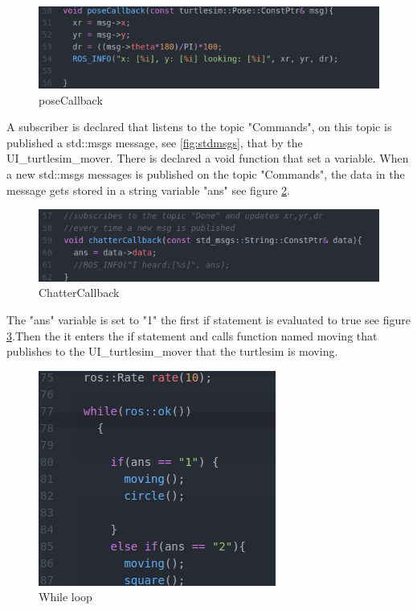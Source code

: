 \begin{figure}[h]
\begin{center}
\includegraphics[width=.5\textwidth]{figures/posecall.png}
\caption{poseCallback}\label{fig:pose}
\end{center} 
\end{figure}

A subscriber is declared  that listens to the topic "Commands", on this topic is published a std::msgs message, see \ref{fig:stdmsgs}, that by the UI\_turtlesim\_mover. There is declared a void function that set a variable. When a new std::msgs messages is published on the topic "Commands", the data in the message gets stored in a string variable "ans" see figure \ref{fig:ChatterCallback}.\\
\begin{figure}[h!]
\begin{center}
\includegraphics[width=.5\textwidth]{figures/chatterCallback.png}
\caption{ChatterCallback}\label{fig:ChatterCallback}
\end{center}
\end{figure}


The "ans" variable is set to "1" the first if statement is evaluated to true see figure \ref{fig:while}.Then the it enters the if statement and calls function named moving  that publishes to the UI\_turtlesim\_mover that the turtlesim is moving.\\

\begin{figure}[h]
\begin{center}
\includegraphics[width=.5\textwidth]{figures/while.png}
\caption{While loop}\label{fig:while}
\end{center}
\end{figure}

